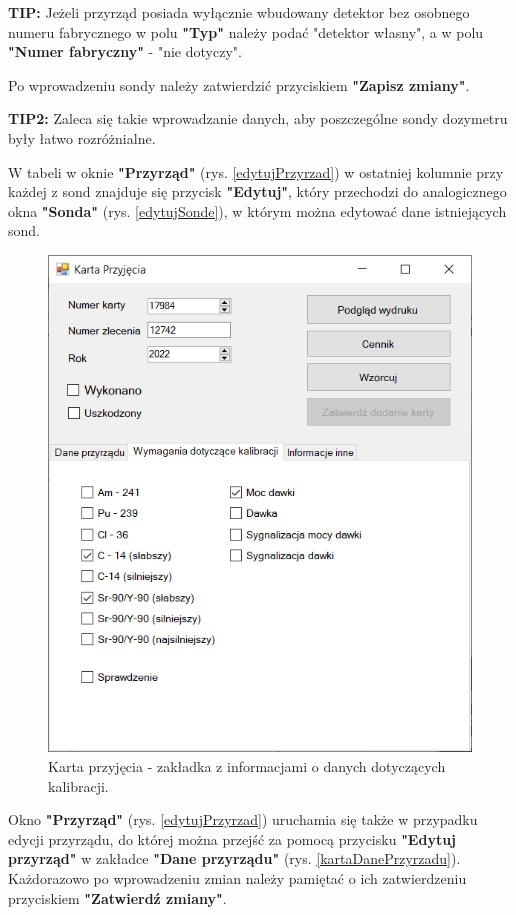 \textbf{TIP:} Jeżeli przyrząd posiada wyłącznie wbudowany detektor bez osobnego numeru fabrycznego w polu \textbf{"Typ"} należy podać "detektor własny", a w polu \textbf{"Numer fabryczny"} - "nie dotyczy". 

Po wprowadzeniu sondy należy zatwierdzić przyciskiem \textbf{"Zapisz zmiany"}. 

\textbf{TIP2:} Zaleca się takie wprowadzanie danych, aby poszczególne sondy dozymetru były łatwo rozróżnialne.

W tabeli w oknie \textbf{"Przyrząd"} (rys. \ref{edytujPrzyrzad}) w ostatniej kolumnie przy każdej z sond znajduje się przycisk \textbf{"Edytuj"}, który przechodzi do analogicznego okna \textbf{"Sonda"} (rys. \ref{edytujSonde}), w którym można edytować dane istniejących sond. 

\begin{figure}[H]
	\centering
	\includegraphics{obrazki/Biuro/karta/karta_dane_wymagania.png}
	\caption{Karta przyjęcia - zakładka z informacjami o danych dotyczących kalibracji.}
	\label{kartaDaneKalibracji}
\end{figure}

Okno \textbf{"Przyrząd"} (rys. \ref{edytujPrzyrzad}) uruchamia się także w przypadku edycji przyrządu, do której można przejść za pomocą przycisku \textbf{"Edytuj przyrząd"} w zakładce \textbf{"Dane przyrządu"} (rys. \ref{kartaDanePrzyrzadu}). Każdorazowo po wprowadzeniu zmian należy pamiętać o ich zatwierdzeniu przyciskiem \textbf{"Zatwierdź zmiany"}.
 

